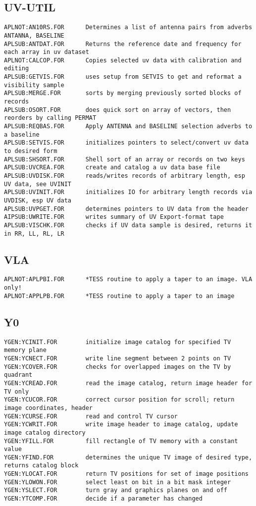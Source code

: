 \subsection{UV-UTIL}
\begin{verbatim}
APLNOT:AN10RS.FOR      Determines a list of antenna pairs from adverbs ANTANNA, BASELINE
APLSUB:ANTDAT.FOR      Returns the reference date and frequency for each array in uv dataset
APLNOT:CALCOP.FOR      Copies selected uv data with calibration and editing
APLSUB:GETVIS.FOR      uses setup from SETVIS to get and reformat a visibility sample
APLSUB:MERGE.FOR       sorts by merging previously sorted blocks of records
APLSUB:OSORT.FOR       does quick sort on array of vectors, then reorders by calling PERMAT
APLSUB:REQBAS.FOR      Apply ANTENNA and BASELINE selection adverbs to a baseline
APLSUB:SETVIS.FOR      initializes pointers to select/convert uv data to desired form
APLSUB:SHSORT.FOR      Shell sort of an array or records on two keys
APLSUB:UVCREA.FOR      create and catalog a uv data base file
APLSUB:UVDISK.FOR      reads/writes records of arbitrary length, esp UV data, see UVINIT
APLSUB:UVINIT.FOR      initializes IO for arbitrary length records via UVDISK, esp UV data
APLSUB:UVPGET.FOR      determines pointers to UV data from the header
AIPSUB:UWRITE.FOR      writes summary of UV Export-format tape
APLSUB:VISCHK.FOR      checks if UV data sample is desired, returns it in RR, LL, RL, LR
\end{verbatim}
 
\subsection{VLA}
\begin{verbatim}
APLNOT:APLPBI.FOR      *TESS routine to apply a taper to an image. VLA only!
APLNOT:APPLPB.FOR      *TESS routine to apply a taper to an image
\end{verbatim}
 
\subsection{Y0}
\begin{verbatim}
YGEN:YCINIT.FOR        initialize image catalog for specified TV memory plane
YGEN:YCNECT.FOR        write line segment between 2 points on TV
YGEN:YCOVER.FOR        checks for overlapped images on the TV by quadrant
YGEN:YCREAD.FOR        read the image catalog, return image header for TV only
YGEN:YCUCOR.FOR        correct cursor position for scroll; return image coordinates, header
YGEN:YCURSE.FOR        read and control TV cursor
YGEN:YCWRIT.FOR        write image header to image catalog, update image catalog directory
YGEN:YFILL.FOR         fill rectangle of TV memory with a constant value
YGEN:YFIND.FOR         determines the unique TV image of desired type, returns catalog block
YGEN:YLOCAT.FOR        return TV positions for set of image positions
YGEN:YLOWON.FOR        select least on bit in a bit mask integer
YGEN:YSLECT.FOR        turn gray and graphics planes on and off
YGEN:YTCOMP.FOR        decide if a parameter has changed
\end{verbatim}
 

